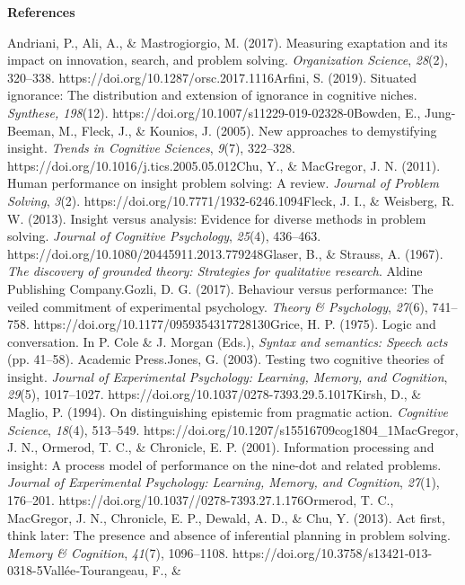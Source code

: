 \textbf{\hfill\break
}

\textbf{References}

Andriani, P., Ali, A., \& Mastrogiorgio, M. (2017). Measuring exaptation
and its impact on innovation, search, and problem solving.
\emph{Organization Science}, \emph{28}(2), 320--338.
https://doi.org/10.1287/orsc.2017.1116Arfini, S. (2019). Situated
ignorance: The distribution and extension of ignorance in cognitive
niches. \emph{Synthese, 198}(12).
https://doi.org/10.1007/s11229-019-02328-0Bowden, E., Jung-Beeman, M.,
Fleck, J., \& Kounios, J. (2005). New approaches to demystifying
insight. \emph{Trends in Cognitive Sciences}, \emph{9}(7), 322--328.
https://doi.org/10.1016/j.tics.2005.05.012Chu, Y., \& MacGregor, J. N.
(2011). Human performance on insight problem solving: A review.
\emph{Journal of Problem Solving}, \emph{3}(2).
https://doi.org/10.7771/1932-6246.1094Fleck, J. I., \& Weisberg, R. W.
(2013). Insight versus analysis: Evidence for diverse methods in problem
solving. \emph{Journal of Cognitive Psychology}, \emph{25}(4), 436--463.
https://doi.org/10.1080/20445911.2013.779248Glaser, B., \& Strauss, A.
(1967). \emph{The discovery of grounded theory: Strategies for
qualitative research}. Aldine Publishing Company.Gozli, D. G. (2017).
Behaviour versus performance: The veiled commitment of experimental
psychology. \emph{Theory \& Psychology}, \emph{27}(6), 741--758.
https://doi.org/10.1177/0959354317728130Grice, H. P. (1975). Logic and
conversation. In P. Cole \& J. Morgan (Eds.), \emph{Syntax and
semantics: Speech acts} (pp. 41--58). Academic Press.Jones, G. (2003).
Testing two cognitive theories of insight. \emph{Journal of Experimental
Psychology: Learning, Memory, and Cognition}, \emph{29}(5), 1017--1027.
https://doi.org/10.1037/0278-7393.29.5.1017Kirsh, D., \& Maglio, P.
(1994). On distinguishing epistemic from pragmatic action.
\emph{Cognitive Science}, \emph{18}(4), 513--549.
https://doi.org/10.1207/s15516709cog1804\_1MacGregor, J. N., Ormerod, T.
C., \& Chronicle, E. P. (2001). Information processing and insight: A
process model of performance on the nine-dot and related problems.
\emph{Journal of Experimental Psychology: Learning, Memory, and
Cognition}, \emph{27}(1), 176--201.
https://doi.org/10.1037//0278-7393.27.1.176Ormerod, T. C., MacGregor, J.
N., Chronicle, E. P., Dewald, A. D., \& Chu, Y. (2013). Act first, think
later: The presence and absence of inferential planning in problem
solving. \emph{Memory \& Cognition}, \emph{41}(7), 1096--1108.
https://doi.org/10.3758/s13421-013-0318-5Vallée‐Tourangeau, F., \&
